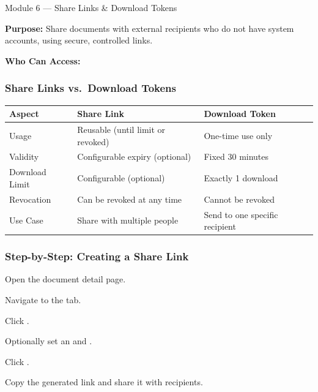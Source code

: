 \begin{ugModule}{Module 6 --- Share Links \& Download Tokens}

  \textbf{Purpose:}
  Share documents with external recipients who do not have
  system accounts, using secure, controlled links.

  \textbf{Who Can Access:}
   

  \subsubsection*{Share Links vs.\ Download Tokens}
  \begin{tabularx}{\textwidth}{@{} l X X @{}}
    \toprule
    \textbf{Aspect} & \textbf{Share Link}
      & \textbf{Download Token} \\
    \midrule
    Usage
      & Reusable (until limit or revoked)
      & One-time use only \\
    Validity
      & Configurable expiry (optional)
      & Fixed 30 minutes \\
    Download Limit
      & Configurable (optional)
      & Exactly 1 download \\
    Revocation
      & Can be revoked at any time
      & Cannot be revoked \\
    Use Case
      & Share with multiple people
      & Send to one specific recipient \\
    \bottomrule
  \end{tabularx}

  \subsubsection*{Step-by-Step: Creating a Share Link}
  \begin{ugSteps}
    \item Open the document detail page.
    \item Navigate to the  tab.
    \item Click .
    \item Optionally set an  and
          .
    \item Click .
    \item Copy the generated link and share it with recipients.
  \end{ugSteps}


\end{ugModule}
